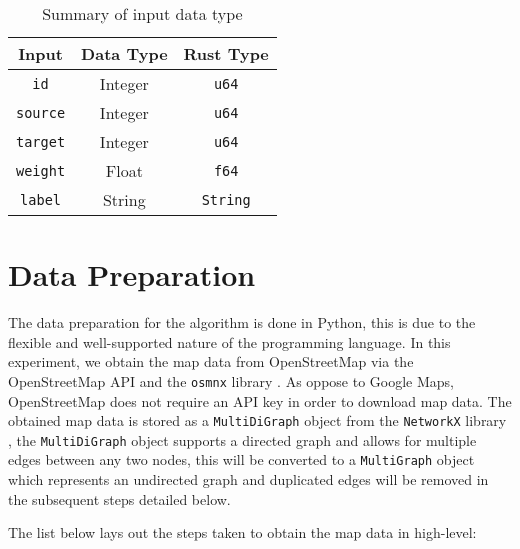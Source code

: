 \begin{table}[htbp]
    \begin{center}
        \caption{Summary of input data type}
        \label{tab:data_type}
        \begin{tabular}{ |c|c|c| }
            \hline
            \textbf{Input} & \textbf{Data Type} & \textbf{Rust Type} \\
            \hline
            \hline
            \verb|id| & Integer & \verb|u64| \\
            \hline
            \verb|source| & Integer & \verb|u64| \\
            \hline
            \verb|target| & Integer & \verb|u64| \\
            \hline
            \verb|weight| & Float & \verb|f64| \\
            \hline
            \verb|label| & String & \verb|String| \\
            \hline
        \end{tabular}
    \end{center}
\end{table}

\section{Data Preparation}

The data preparation for the algorithm is done in Python, this is due to the flexible and well-supported nature of the programming language. In this experiment, we obtain the map data from OpenStreetMap via the OpenStreetMap API and the \verb|osmnx| library \cite{OSMnx}. As oppose to Google Maps, OpenStreetMap does not require an API key in order to download map data. The obtained map data is stored as a \verb|MultiDiGraph| object from the \verb|NetworkX| library \cite{SciPyProceedings_11}, the \verb|MultiDiGraph| object supports a directed graph and allows for multiple edges between any two nodes, this will be converted to a \verb|MultiGraph| object which represents an undirected graph and duplicated edges will be removed in the subsequent steps detailed below.

The list below lays out the steps taken to obtain the map data in high-level:

